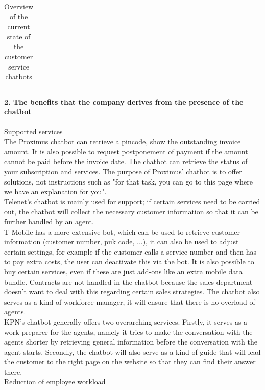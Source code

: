 \begin{table}[!htb]
\begin{tabular}{|lllll|}
	\end{tabular}
	\caption{Overview of the current state of the customer service chatbots}
	\label{tab:xxx}
\end{table}

\paragraph{2. The benefits that the company derives from the presence of the
	chatbot}
\ul{Supported services}\\
The Proximus chatbot can retrieve a pincode, show the outstanding invoice amount. It is also possible to request postponement of payment if the amount cannot be paid before the invoice date. The chatbot can retrieve the status of your subscription and services. The purpose of Proximus' chatbot is to offer solutions, not instructions such as "for that task, you can go to this page where we have an explanation for you".\\
\break
Telenet's chatbot is mainly used for support; if certain services need to be carried out, the chatbot will collect the necessary customer information so that it can be further handled by an agent.\\
\break
T-Mobile has a more extensive bot, which can be used to retrieve customer information (customer number, puk code, ...), it can also be used to adjust certain settings, for example if the customer calls a service number and then has to pay extra costs, the user can deactivate this via the bot. It is also possible to buy certain services, even if these are just add-ons like an extra mobile data bundle. Contracts are not handled in the chatbot because the sales department doesn't want to deal with this regarding certain sales strategies. The chatbot also serves as a kind of workforce manager, it will ensure that there is no overload of agents.\\
\break
KPN's chatbot generally offers two overarching services. Firstly, it serves as a work preparer for the agents, namely it tries to make the conversation with the agents shorter by retrieving general information before the conversation with the agent starts. Secondly, the chatbot will also serve as a kind of guide that will lead the customer to the right page on the website so that they can find their answer there.\\
\break
\ul{Reduction of employee workload}\\

